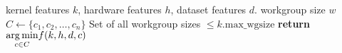 \begin{algorithmic}[1]
\Require kernel features $k$, hardware features $h$, dataset features
$d$.
\Ensure workgroup size $w$
\State $C \leftarrow \{c_1, c_2, \ldots, c_n \}$
\Comment Set of all workgroup sizes $\le k.\text{max\_wgsize}$
\State \textbf{return} $\underset{c \in C}{\operatorname*{arg\,min}} f(k,h,d,c)$
\end{algorithmic}

